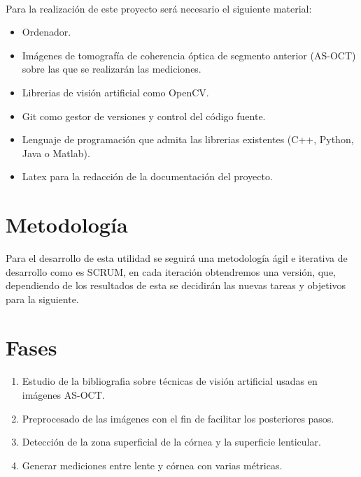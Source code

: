 \documentclass[12pt]{article}
\begin{document}
\paragraph{}
Para la realización de este proyecto será necesario el siguiente material:
\begin{itemize}
	\item Ordenador.
	\item Imágenes de tomografía de coherencia óptica de segmento anterior (AS-OCT)\cite{AS-OCT} sobre las que se realizarán las mediciones.
	\item Librerias de visión artificial como OpenCV\cite{cv2}.
	\item Git\cite{git} como gestor de versiones y control del código fuente.
	\item Lenguaje de programación que admita las librerias existentes (C++, Python, Java o Matlab).
	\item Latex\cite{latex} para la redacción de la documentación del proyecto.
\end{itemize}

\newpage
\section{Metodología}
Para el desarrollo de esta utilidad se seguirá una metodología ágil e iterativa de desarrollo como es SCRUM, en cada iteración obtendremos una versión, que, dependiendo de los resultados de esta se decidirán las nuevas tareas y objetivos para la siguiente. 
\paragraph{}

\newpage
\section{Fases}
\paragraph{}
\begin{enumerate}
	\item Estudio de la bibliografia sobre técnicas de visión artificial usadas en imágenes AS-OCT.
	\item Preprocesado de las imágenes con el fin de facilitar los posteriores pasos.
	\item Detección de la zona superficial de la córnea y la superficie lenticular.
	\item Generar mediciones entre lente y córnea con varias métricas.
\end{enumerate}
\end{document}

